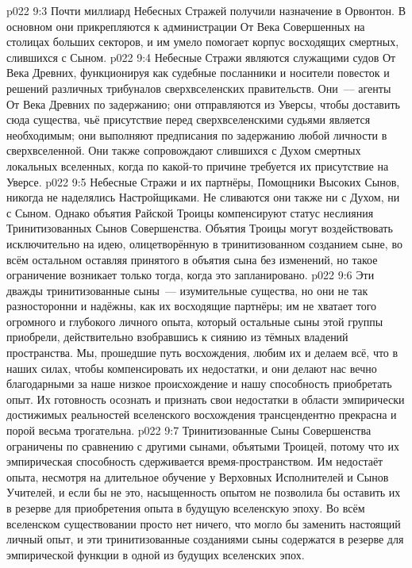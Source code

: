 \vs p022 9:3 \pc Почти миллиард Небесных Стражей получили назначение в Орвонтон. В основном они прикрепляются к администрации От Века Совершенных на столицах больших секторов, и им умело помогает корпус восходящих смертных, слившихся с Сыном.
\vs p022 9:4 Небесные Стражи являются служащими судов От Века Древних, функционируя как судебные посланники и носители повесток и решений различных трибуналов сверхвселенских правительств. Они~--- агенты От Века Древних по задержанию; они отправляются из Уверсы, чтобы доставить сюда существа, чьё присутствие перед сверхвселенскими судьями является необходимым; они выполняют предписания по задержанию любой личности в сверхвселенной. Они также сопровождают слившихся с Духом смертных локальных вселенных, когда по какой\hyp{}то причине требуется их присутствие на Уверсе.
\vs p022 9:5 \pc Небесные Стражи и их партнёры, Помощники Высоких Сынов, никогда не наделялись Настройщиками. Не сливаются они также ни с Духом, ни с Сыном. Однако объятия Райской Троицы компенсируют статус неслияния Тринитизованных Сынов Совершенства. Объятия Троицы могут воздействовать исключительно на идею, олицетворённую в тринитизованном созданием сыне, во всём остальном оставляя принятого в объятия сына без изменений, но такое ограничение возникает только тогда, когда это запланировано.
\vs p022 9:6 Эти дважды тринитизованные сыны~--- изумительные существа, но они не так разносторонни и надёжны, как их восходящие партнёры; им не хватает того огромного и глубокого личного опыта, который остальные сыны этой группы приобрели, действительно взобравшись к сиянию из тёмных владений пространства. Мы, прошедшие путь восхождения, любим их и делаем всё, что в наших силах, чтобы компенсировать их недостатки, и они делают нас вечно благодарными за наше низкое происхождение и нашу способность приобретать опыт. Их готовность осознать и признать свои недостатки в области эмпирически достижимых реальностей вселенского восхождения трансцендентно прекрасна и порой весьма трогательна.
\vs p022 9:7 Тринитизованные Сыны Совершенства ограничены по сравнению с другими сынами, объятыми Троицей, потому что их эмпирическая способность сдерживается время\hyp{}пространством. Им недостаёт опыта, несмотря на длительное обучение у Верховных Исполнителей и Сынов Учителей, и если бы не это, насыщенность опытом не позволила бы оставить их в резерве для приобретения опыта в будущую вселенскую эпоху. Во всём вселенском существовании просто нет ничего, что могло бы заменить настоящий личный опыт, и эти тринитизованные созданиями сыны содержатся в резерве для эмпирической функции в одной из будущих вселенских эпох.

